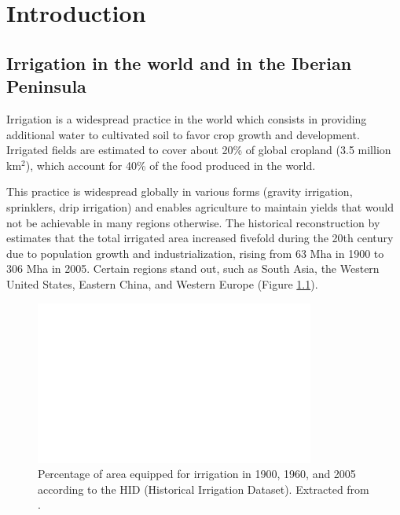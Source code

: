\chapter{Introduction}
\label{chap:introduction}
\minitoc
\pagebreak

\section{Irrigation in the world and in the Iberian Peninsula}
Irrigation is a widespread practice in the world which consists in providing additional water to cultivated soil to favor crop growth and development.
Irrigated fields are estimated to cover about 20\% of global cropland (3.5 million km$^2$), which account for 40\% of the food produced in the world.

This practice is widespread globally in various forms (gravity irrigation, sprinklers, drip irrigation) and enables agriculture to maintain yields that would not be achievable in many regions otherwise. The historical reconstruction by \citet{siebert_global_2015} estimates that the total irrigated area increased fivefold during the 20th century due to population growth and industrialization, rising from 63 Mha in 1900 to 306 Mha in 2005. Certain regions stand out, such as South Asia, the Western United States, Eastern China, and Western Europe (Figure \ref{irrig_evolution_map}).

\begin{figure}[ht]
    \centering
    \includegraphics[width=\textwidth]{images/intro/irrig_evolution_Siebert.png}
    \caption{Percentage of area equipped for irrigation in 1900, 1960, and 2005 according to the HID (Historical Irrigation Dataset). Extracted from \citet{siebert_global_2015}.}
    \label{irrig_evolution_map}
\end{figure}


